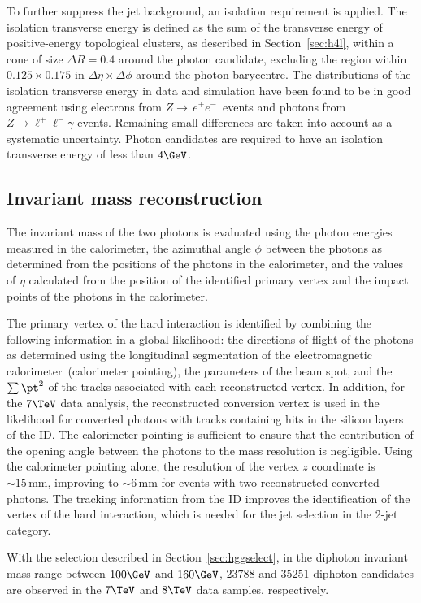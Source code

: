 \documentclass[final,3p,times,twocolumn]{elsarticle}
\newcommand{\ztoee}{\ensuremath{Z{\rightarrow\,}e^+e^-}}
\begin{document}
To further suppress the jet background, an isolation requirement is applied.
The isolation transverse energy is defined as the sum of the transverse energy of positive-energy
topological clusters, as described in Section~\ref{sec:h4l}, within a cone of size $\Delta R = 0.4$ around the photon candidate,
excluding the region within $0.125\times 0.175$ in $\Delta\eta\times\Delta\phi$ around the photon barycentre.
The distributions of the isolation transverse energy in data and simulation have been found to be in good agreement using electrons from 
\ztoee\ events 
and photons from $Z\to\ell^+\ell^-\gamma$ events.
Remaining small differences are taken into account as a systematic uncertainty.
Photon candidates are required to have an isolation transverse energy of less than $4\GeV$.

\subsection{Invariant mass reconstruction}
The invariant mass of the two photons is evaluated using the photon energies measured in the calorimeter,
the azimuthal angle $\phi$ between the photons as determined from the positions of the photons in the calorimeter, and the values of
$\eta$ calculated from the position of the identified primary vertex and the impact points of the photons in the calorimeter.

The primary vertex of the hard interaction is
identified by combining the following information in a global likelihood:
the directions of flight of the photons as determined
using the longitudinal segmentation of the electromagnetic calorimeter~(calorimeter pointing), the parameters of the beam spot,
and the $\sum\pt^2$ of the tracks associated with each reconstructed vertex.
In addition, for the $7\TeV$ data analysis, the reconstructed conversion vertex is used
in the likelihood for converted photons with tracks containing hits in the silicon layers of the ID.
The calorimeter pointing is sufficient to ensure that 
the contribution of the opening angle between the photons to the mass resolution is negligible.
Using the calorimeter pointing alone,
the resolution of the vertex $z$ coordinate is $\sim\!15\,\mathrm{mm}$,
improving to $\sim\!6\,\mathrm{mm}$ for events with two reconstructed converted photons.
The tracking information from the ID improves the identification of the vertex of the hard interaction, which is needed for the jet selection in the 2-jet category.

With the selection described in Section~\ref{sec:hggselect},
in the diphoton invariant mass range between $100\GeV$ and $160\GeV$,
$23788$ and $35251$ diphoton candidates are observed
in the $7\TeV$ and $8\TeV$ data samples, respectively.
\end{document}
